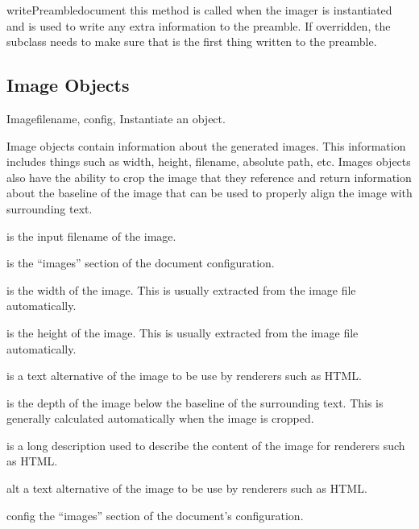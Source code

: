 \begin{methoddesc}[Imager]{writePreamble}{document}
this method is called when the imager is instantiated and is used to
write any extra information to the preamble.  If overridden, the
subclass needs to make sure that  is
the first thing written to the preamble.
\end{methoddesc}


\subsection{Image Objects}

\begin{classdesc}{Image}{filename, config, }
Instantiate an  object.

Image objects contain information about the generated images.  This
information includes things such as width, height, filename, absolute
path, etc.  Images objects also have the ability to crop the image
that they reference and return information about the baseline of the
image that can be used to properly align the image with surrounding
text.

 is the input filename of the image.

 is the ``images'' section of the document configuration.

 is the width of the image.  This is usually extracted from
the image file automatically.

 is the height of the image.  This is usually extracted
from the image file automatically.

 is a text alternative of the image to be use by renderers such
as HTML.

 is the depth of the image below the baseline of the
surrounding text.  This is generally calculated automatically when
the image is cropped.

 is a long description used to describe the content of
the image for renderers such as HTML.
\end{classdesc}

\begin{memberdesc}[Image]{alt}
a text alternative of the image to be use by renderers such as HTML.
\end{memberdesc}

\begin{memberdesc}[Image]{config}
the ``images'' section of the document's configuration.
\end{memberdesc}

